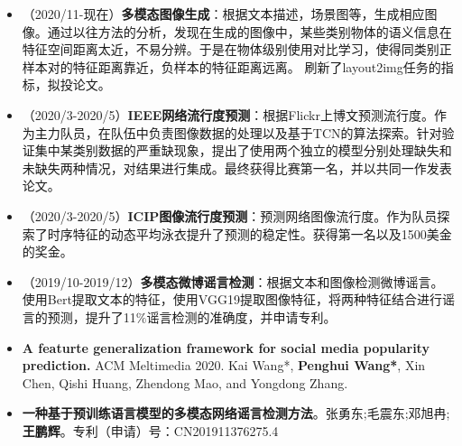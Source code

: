 \documentclass[zh]{resume}
\begin{document}
\begin{itemize}
  \item  （2020/11-现在）\textbf{多模态图像生成}：根据文本描述，场景图等，生成相应图像。通过以往方法的分析，发现在生成的图像中，某些类别物体的语义信息在特征空间距离太近，不易分辨。于是在物体级别使用对比学习，使得同类别正样本对的特征距离靠近，负样本的特征距离远离。 刷新了layout2img任务的指标，拟投论文。
  \item （2020/3-2020/5）\textbf{IEEE网络流行度预测}：根据Flickr上博文预测流行度。作为主力队员，在队伍中负责图像数据的处理以及基于TCN的算法探索。针对验证集中某类别数据的严重缺现象，提出了使用两个独立的模型分别处理缺失和未缺失两种情况，对结果进行集成。最终获得比赛第一名，并以共同一作发表论文。
  \item （2020/3-2020/5）\textbf{ICIP图像流行度预测}：预测网络图像流行度。作为队员探索了时序特征的动态平均泳衣提升了预测的稳定性。获得第一名以及1500美金的奖金。
  \item （2019/10-2019/12）\textbf{多模态微博谣言检测}：根据文本和图像检测微博谣言。使用Bert提取文本的特征，使用VGG19提取图像特征，将两种特征结合进行谣言的预测，提升了11$\%$谣言检测的准确度，并申请专利。

\end{itemize}

\begin{itemize}
  \item \textbf{A featurte generalization framework for social media popularity prediction.} ACM Meltimedia 2020. 
  Kai Wang*, \textbf{Penghui Wang*}, Xin Chen, Qishi Huang, Zhendong Mao, and Yongdong Zhang.
  \item \textbf{一种基于预训练语言模型的多模态网络谣言检测方法}。张勇东;毛震东;邓旭冉;\textbf{王鹏辉}。专利（申请）号：CN201911376275.4

\end{itemize}

\end{document}
